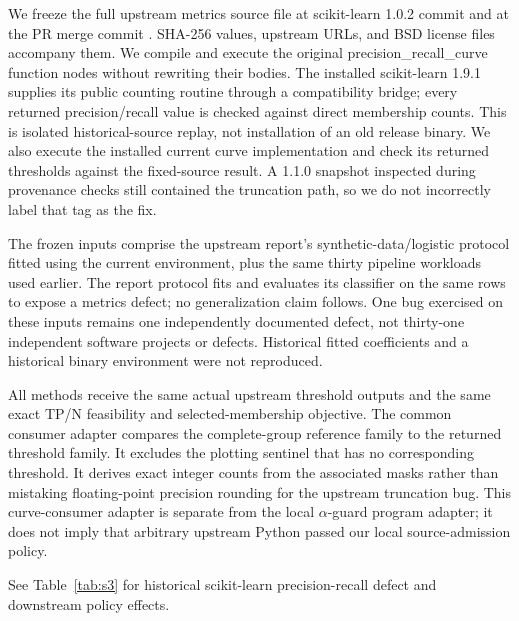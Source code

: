 \documentclass[11pt,a4paper]{article}
\theoremstyle{plain}
\theoremstyle{definition}
\theoremstyle{remark}
\begin{document}
We freeze the full upstream metrics source file at scikit-learn 1.0.2 commit \texttt{} and at the PR merge commit \texttt{}. SHA-256 values, upstream URLs, and BSD license files accompany them. We compile and execute the original precision\_recall\_curve function nodes without rewriting their bodies. The installed scikit-learn 1.9.1 supplies its public counting routine through a compatibility bridge; every returned precision/recall value is checked against direct membership counts. This is isolated historical-source replay, not installation of an old release binary. We also execute the installed current curve implementation and check its returned thresholds against the fixed-source result. A 1.1.0 snapshot inspected during provenance checks still contained the truncation path, so we do not incorrectly label that tag as the fix.

The frozen inputs comprise the upstream report's synthetic-data/logistic protocol fitted using the current environment, plus the same thirty pipeline workloads used earlier. The report protocol fits and evaluates its classifier on the same rows to expose a metrics defect; no generalization claim follows. One bug exercised on these inputs remains one independently documented defect, not thirty-one independent software projects or defects. Historical fitted coefficients and a historical binary environment were not reproduced.

All methods receive the same actual upstream threshold outputs and the same exact TP/N feasibility and selected-membership objective. The common consumer adapter compares the complete-group reference family to the returned threshold family. It excludes the plotting sentinel that has no corresponding threshold. It derives exact integer counts from the associated masks rather than mistaking floating-point precision rounding for the upstream truncation bug. This curve-consumer adapter is separate from the local $\alpha$-guard program adapter; it does not imply that arbitrary upstream Python passed our local source-admission policy.

See Table~\ref{tab:s3} for historical scikit-learn precision-recall defect and downstream policy effects.
\end{document}
